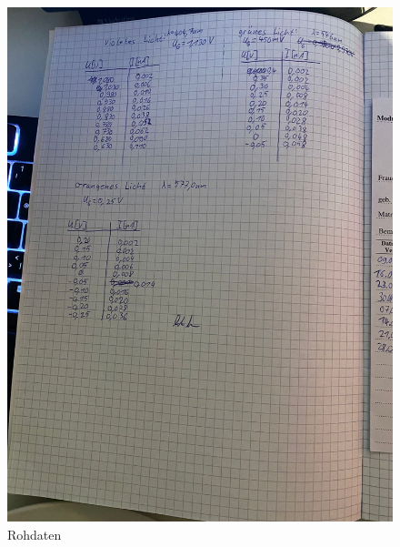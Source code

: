 \begin{figure}[H]
  \includegraphics[width=\textwidth]{Bilder/Rohdaten2.jpg}
  \caption{Rohdaten}
\end{figure}

